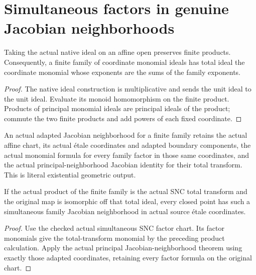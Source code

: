 \section{Simultaneous factors in genuine Jacobian neighborhoods}

\begin{lemma}\label{lem:sc0-native-family-monomial-product}
\leanok
Taking the actual native ideal on an affine open preserves finite products.
Consequently, a finite family of coordinate monomial ideals has total ideal
the coordinate monomial whose exponents are the sums of the family exponents.
\end{lemma}
\begin{proof}
The native ideal construction is multiplicative and sends the unit ideal to
the unit ideal. Evaluate its monoid homomorphism on the finite product.
Products of principal monomial ideals are principal ideals of the product;
commute the two finite products and add powers of each fixed coordinate.
\end{proof}

\begin{definition}\label{def:sc0-snc-family-jacobian-neighbourhood}
\leanok
An actual adapted Jacobian neighborhood for a finite family retains the
actual affine chart, its actual \'etale coordinates and adapted boundary
components, the actual monomial formula for every family factor in those
same coordinates, and the actual principal-neighborhood Jacobian identity
for their total transform. This is literal existential geometric output.
\end{definition}

\begin{lemma}\label{lem:sc0-snc-family-jacobian-at-closed}
\leanok
{}
If the actual product of the finite family is the actual SNC total transform
and the original map is isomorphic off that total ideal, every closed point
has such a simultaneous family Jacobian neighborhood in actual source
\'etale coordinates.
\end{lemma}
\begin{proof}
Use the checked actual simultaneous SNC factor chart. Its factor monomials
give the total-transform monomial by the preceding product calculation.
Apply the actual principal Jacobian-neighborhood theorem using exactly those
adapted coordinates, retaining every factor formula on the original chart.
\end{proof}

